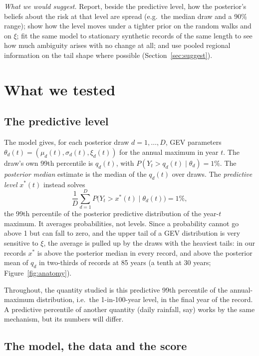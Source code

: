 \documentclass[11pt]{article}
\newcommand{\xs}{x^{*}}
\begin{document}
\emph{What we would suggest.} Report, beside the predictive level, how the posterior's beliefs
about the risk at that level are spread (e.g.\ the median draw and a 90\% range); show how the level
moves under a tighter prior on the random walks and on $\xi$; fit the same model to stationary
synthetic records of the same length to see how much ambiguity arises with no change at all; and
use pooled regional information on the tail shape where possible (Section~\ref{sec:suggest}).

\tableofcontents

\section{What we tested}\label{sec:what}

\subsection{The predictive level}

The model gives, for each posterior draw $d=1,\dots,D$, GEV parameters
$\theta_d(t)=(\mu_d(t),\sigma_d(t),\xi_d(t))$ for the annual maximum in year $t$. The draw's own
99th percentile is $q_d(t)$, with $P(Y_t>q_d(t)\mid\theta_d)=1\%$. The \emph{posterior median}
estimate is the median of the $q_d(t)$ over draws. The \emph{predictive level} $\xs(t)$ instead
solves
\begin{equation}
\frac1D\sum_{d=1}^{D} P\bigl(Y_t>\xs(t)\mid\theta_d(t)\bigr)=1\%,
\end{equation}
the 99th percentile of the posterior predictive distribution of the year-$t$ maximum. It averages
probabilities, not levels. Since a probability cannot go above 1 but can fall to zero, and the
upper tail of a GEV distribution is very sensitive to $\xi$, the average is pulled up by the draws
with the heaviest tails: in our records $\xs$ is above the posterior median in every record, and
above the posterior mean of $q_d$ in two-thirds of records at 85 years (a tenth at 30 years;
Figure~\ref{fig:anatomy}).

Throughout, the quantity studied is this predictive 99th percentile of the annual-maximum
distribution, i.e.\ the 1-in-100-year level, in the final year of the record. A predictive
percentile of another quantity (daily rainfall, say) works by the same mechanism, but its numbers
will differ.

\subsection{The model, the data and the score}
\end{document}
